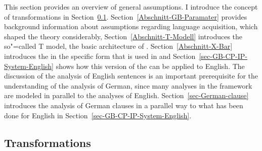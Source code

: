 This section provides an overview of general assumptions. I introduce the concept of transformations
in Section~\ref{Abschnitt-Transformationen}. Section~\ref{Abschnitt-GB-Paramater} provides
background information about assumptions regarding language acquisition, which shaped the theory
considerably, Section~\ref{Abschnitt-T-Modell} introduces the so"=called T model, the basic
architecture of \gbt. Section~\ref{Abschnitt-X-Bar} introduces the \xbart in the specific form that is used in \gb
and Section~\ref{sec-GB-CP-IP-System-English} shows how this version of the \xbart can be applied to English. The discussion of
the analysis of English sentences is an important prerequisite for the understanding of the analysis
of German, since many analyses in the \gb framework are modeled in parallel to the analyses of
English. Section~\ref{sec-German-clause} introduces the analysis of German clauses in a parallel way
to what has been done for English in Section~\ref{sec-GB-CP-IP-System-English}.

\subsection{Transformations}
\label{Abschnitt-Transformationen}

